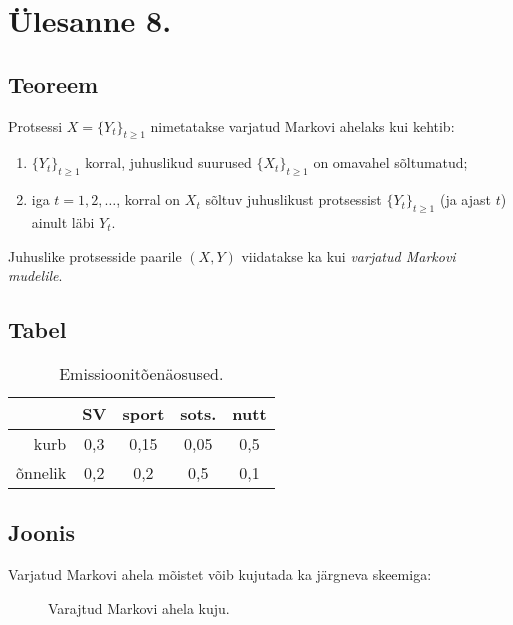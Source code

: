 \section{Ülesanne 8.}

\subsection{Teoreem}

\begin{definition}%
	Protsessi $X = \{Y_t\}_{t\geq1}$ nimetatakse varjatud Markovi ahelaks kui kehtib:

	\begin{enumerate}
		\item $\{Y_t\}_{t\geq1}$ korral, juhuslikud suurused $\{X_t\}_{t\geq1}$ on omavahel sõltumatud;
		\item iga $t = 1,2,\dots$, korral on $X_t$ sõltuv juhuslikust protsessist $\{Y_t\}_{t\geq1}$ (ja ajast $t$) ainult läbi $Y_t$.
	\end{enumerate}

	Juhuslike protsesside paarile $(X, Y)$ viidatakse ka kui \textit{varjatud Markovi mudelile}.
\end{definition}

\subsection{Tabel}

\begin{table}[h]
	\centering
	\begin{tabular}{ r | *{4}{c} }	
						& SV 	& sport & sots. & nutt\\
		\hline
			 kurb & 0,3 & 0,15	 & 0,05 & 0,5 \\
		õnnelik & 0,2	& 0,2   & 0,5	& 0,1 \\
	\end{tabular}

	\caption{Emissioonitõenäosused.}
	\label{fig:HMM.ex.emission}
\end{table}

\subsection{Joonis}

Varjatud Markovi ahela mõistet võib kujutada ka järgneva skeemiga:

\begin{figure}[h]
	\centering
	
	\caption{Varajtud Markovi ahela kuju.}
	\label{fig:HMM}
\end{figure}

